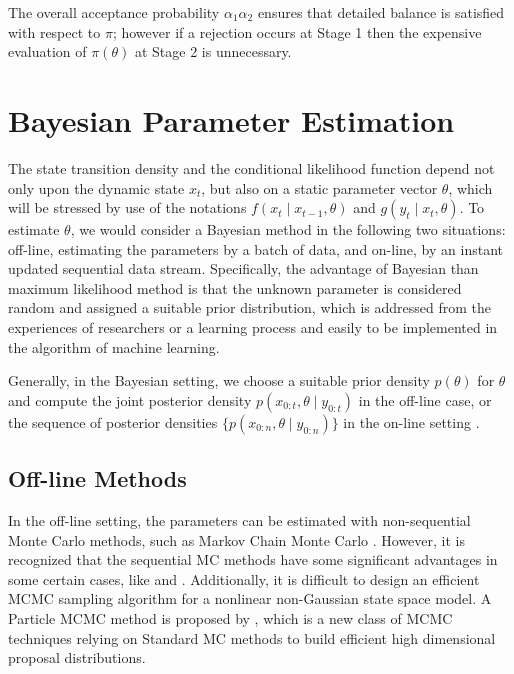 The overall acceptance probability $\alpha_1\alpha_2$ ensures that detailed balance is satisfied with respect to $\pi$; however if a rejection occurs at Stage 1 then the expensive evaluation of $\pi(\theta)$ at Stage 2 is unnecessary.



\section{Bayesian Parameter Estimation}

The state transition density and the conditional likelihood function depend not only upon the dynamic state $x_t$, but also on a static parameter vector $\theta$, which will be stressed by use of the notations $f(x_t \mid x_{t-1},\theta)$ and $g(y_t\mid x_t,\theta)$. To estimate $\theta$, we would consider a Bayesian method in the following two situations: off-line, estimating the parameters by a batch of data, and on-line, by an instant updated sequential data stream. Specifically, the advantage of Bayesian than maximum likelihood method is that the unknown parameter is considered random and assigned a suitable prior distribution, which is addressed from the experiences of researchers or a learning process and easily to be implemented in the algorithm of machine learning.

Generally, in the Bayesian setting, we choose a suitable prior density $p(\theta)$ for $\theta$ and compute the joint posterior density $p(x_{0:t},\theta \mid y_{0:t})$ in the off-line case, or the sequence of posterior densities $\{ p(x_{0:n},\theta \mid y_{0:n})\}$ in the on-line setting \cite{kantas2009overview}.

\subsection{Off-line Methods}

In the off-line setting, the parameters can be estimated with non-sequential Monte Carlo methods, such as Markov Chain Monte Carlo \cite{robert2004monte}. However, it is recognized that the sequential MC methods have some significant advantages in some certain cases, like \cite{cappe2009inference} and \cite{del2006sequential}. Additionally, it is difficult to design an efficient MCMC sampling algorithm for a nonlinear non-Gaussian state space model. A Particle  MCMC method is proposed by \cite{andrieu2010particle}, which is a new class of MCMC techniques relying on Standard MC methods to build efficient high dimensional proposal distributions. 

